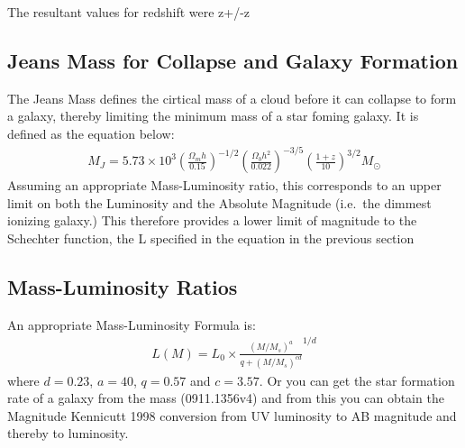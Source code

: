		The resultant values for redshift were z+/-z

	\subsection{Jeans Mass for Collapse and Galaxy Formation} %
	\label{sub:jeans_mass_for_collapse_and_galaxy_formation}
		The Jeans Mass defines the cirtical mass of a cloud before it can collapse to form a galaxy, thereby limiting the minimum mass of a star foming galaxy. It is defined as the equation below:
		\begin{align}
			M_J = 5.73\times 10^3{\left(\frac{\Omega_m h}{0.15} \right)}^{-1/2} {\left( \frac{\Omega_b h^2}{0.022}\right)}^{-3/5} {\left( \frac{1+z}{10} \right)}^{3/2} M_\odot
		\end{align}
		Assuming an appropriate Mass-Luminosity ratio, this corresponds to an upper limit on both the Luminosity and the Absolute Magnitude (i.e.\ the dimmest ionizing galaxy.) This therefore provides a lower limit of magnitude to the Schechter function, the L specified in the equation in the previous section

	\subsection{Mass-Luminosity Ratios} %
	\label{sub:mass_luminosity_ratios}
		An appropriate Mass-Luminosity Formula is:
		\begin{align}
			L(M) = L_0 \times \frac{{(M/M_s)}^a}{q+{(M/M_s)}^{cd}}^{1/d}
		\end{align}
		where $d=0.23$, $a=40$, $q=0.57$ and $c=3.57$. Or you can get the star formation rate of a galaxy from the mass (0911.1356v4) and from this you can obtain the Magnitude Kennicutt 1998 conversion from UV luminosity to AB magnitude and thereby to luminosity.

